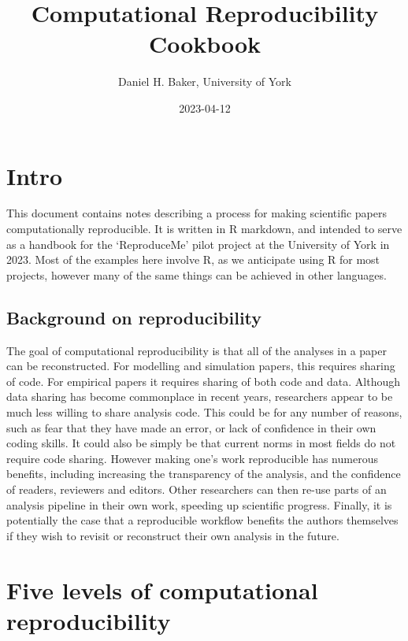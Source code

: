 \documentclass[
]{article}
\title{Computational Reproducibility Cookbook}
\author{Daniel H. Baker, University of York}
\date{2023-04-12}
\begin{document}
\maketitle

\hypertarget{intro}{%
\section{Intro}\label{intro}}

This document contains notes describing a process for making scientific papers computationally reproducible. It is written in R markdown, and intended to serve as a handbook for the `ReproduceMe' pilot project at the University of York in 2023. Most of the examples here involve R, as we anticipate using R for most projects, however many of the same things can be achieved in other languages.

\hypertarget{background-on-reproducibility}{%
\subsection{Background on reproducibility}\label{background-on-reproducibility}}

The goal of computational reproducibility is that all of the analyses in a paper can be reconstructed. For modelling and simulation papers, this requires sharing of code. For empirical papers it requires sharing of both code and data. Although data sharing has become commonplace in recent years, researchers appear to be much less willing to share analysis code. This could be for any number of reasons, such as fear that they have made an error, or lack of confidence in their own coding skills. It could also be simply be that current norms in most fields do not require code sharing. However making one's work reproducible has numerous benefits, including increasing the transparency of the analysis, and the confidence of readers, reviewers and editors. Other researchers can then re-use parts of an analysis pipeline in their own work, speeding up scientific progress. Finally, it is potentially the case that a reproducible workflow benefits the authors themselves if they wish to revisit or reconstruct their own analysis in the future.

\hypertarget{five-levels-of-computational-reproducibility}{%
\section{Five levels of computational reproducibility}\label{five-levels-of-computational-reproducibility}}
\end{document}
